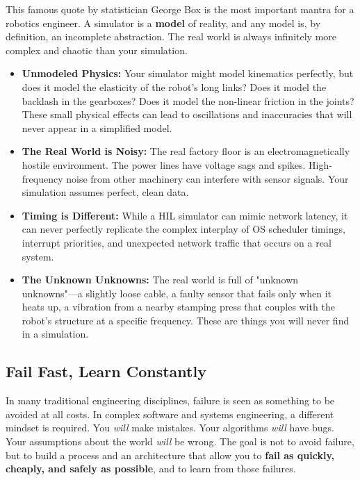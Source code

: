 This famous quote by statistician George Box is the most important mantra for a robotics engineer. A simulator is a \textbf{model} of reality, and any model is, by definition, an incomplete abstraction. The real world is always infinitely more complex and chaotic than your simulation.
\begin{itemize}
    \item \textbf{Unmodeled Physics:} Your simulator might model kinematics perfectly, but does it model the elasticity of the robot's long links? Does it model the backlash in the gearboxes? Does it model the non-linear friction in the joints? These small physical effects can lead to oscillations and inaccuracies that will never appear in a simplified model.
    \item \textbf{The Real World is Noisy:} The real factory floor is an electromagnetically hostile environment. The power lines have voltage sags and spikes. High-frequency noise from other machinery can interfere with sensor signals. Your simulation assumes perfect, clean data.
    \item \textbf{Timing is Different:} While a HIL simulator can mimic network latency, it can never perfectly replicate the complex interplay of OS scheduler timings, interrupt priorities, and unexpected network traffic that occurs on a real system.
    \item \textbf{The Unknown Unknowns:} The real world is full of "unknown unknowns"—a slightly loose cable, a faulty sensor that fails only when it heats up, a vibration from a nearby stamping press that couples with the robot's structure at a specific frequency. These are things you will never find in a simulation.
\end{itemize}


\subsection{Fail Fast, Learn Constantly}
\label{subsec:fail_fast_learn_constantly}

In many traditional engineering disciplines, failure is seen as something to be avoided at all costs. In complex software and systems engineering, a different mindset is required. You \textit{will} make mistakes. Your algorithms \textit{will} have bugs. Your assumptions about the world \textit{will} be wrong. The goal is not to avoid failure, but to build a process and an architecture that allow you to \textbf{fail as quickly, cheaply, and safely as possible}, and to learn from those failures.

